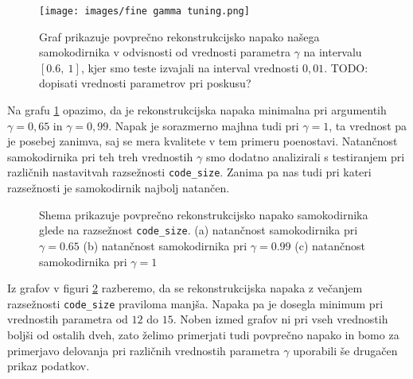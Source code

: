 \documentclass[12pt,a4paper,twoside]{article}
\theoremstyle{definition} %
\theoremstyle{plain} %
\numberwithin{equation}{section}  %
\begin{document}
\begin{figure}[h]
	\centering
	\texttt{[image: images/fine gamma tuning.png]}
	\caption[Podrobnejši graf napake glede na $\gamma$.]{Graf prikazuje povprečno rekonstrukcijsko napako našega 
	samokodirnika v odvisnosti od vrednosti parametra $\gamma$ na intervalu $[0.6,\ 1]$, kjer smo teste izvajali na interval vrednosti $0,01$. 
	TODO: dopisati vrednosti parametrov pri poskusu?}
	\label{fig:gamma_fine}
\end{figure}

Na grafu \ref{fig:gamma_fine} opazimo, da je rekonstrukcijska napaka minimalna pri argumentih $\gamma=0,65$ in $\gamma=0,99$.
Napak je sorazmerno majhna tudi pri $\gamma=1$, ta vrednost pa je posebej zanimva, saj se mera kvalitete v tem primeru poenostavi.
Natančnost samokodirnika pri teh treh vrednostih $\gamma$ smo dodatno analizirali s testiranjem pri različnih nastavitvah razsežnosti \texttt{code\_size}.
Zanima pa nas tudi pri kateri razsežnosti je samokodirnik najbolj natančen.

\begin{figure}[h]
	\centering
	\caption[Tri grafi napake glede na \texttt{code\_size}]{Shema prikazuje povprečno rekonstrukcijsko napako samokodirnika glede na razsežnost \texttt{code\_size}.
		(a) natančnost samokodirnika pri $\gamma = 0.65$ 
		(b) natančnost samokodirnika pri $\gamma = 0.99$ 
		(c) natančnost samokodirnika pri $\gamma = 1$}
	\label{fig:triple_code_size}
\end{figure}

Iz grafov v figuri \ref{fig:triple_code_size} razberemo, da se rekonstrukcijska napaka z večanjem razsežnosti \texttt{code\_size} praviloma manjša.
Napaka pa je dosegla minimum pri vrednostih parametra od $12$ do $15$.
Noben izmed grafov ni pri vseh vrednostih boljši od ostalih dveh, 
zato želimo primerjati tudi povprečno napako in bomo za primerjavo delovanja pri različnih vrednostih parametra $\gamma$ uporabili še drugačen prikaz podatkov.
\end{document}

